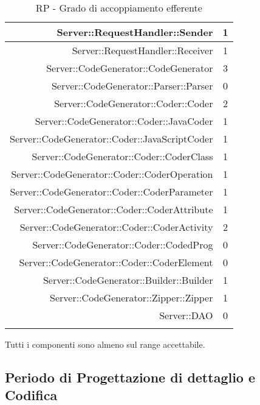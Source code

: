 \documentclass[../PianoDiQualifica.tex]{subfiles}
\begin{document}
\begin{longtable}{|r|c|}
					Server::RequestHandler::Sender & 1 \\ \hline
					Server::RequestHandler::Receiver & 1 \\ \hline
					Server::CodeGenerator::CodeGenerator & 3 \\ \hline
					Server::CodeGenerator::Parser::Parser & 0 \\ \hline
					Server::CodeGenerator::Coder::Coder & 2 \\ \hline
					Server::CodeGenerator::Coder::JavaCoder & 1\\ \hline
					Server::CodeGenerator::Coder::JavaScriptCoder & 1\\ \hline
					Server::CodeGenerator::Coder::CoderClass & 1\\ \hline
					Server::CodeGenerator::Coder::CoderOperation & 1\\ \hline
					Server::CodeGenerator::Coder::CoderParameter & 1\\ \hline
					Server::CodeGenerator::Coder::CoderAttribute & 1\\ \hline
					Server::CodeGenerator::Coder::CoderActivity & 2\\ \hline
					Server::CodeGenerator::Coder::CodedProg & 0\\ \hline
					Server::CodeGenerator::Coder::CoderElement & 0\\ \hline
					Server::CodeGenerator::Builder::Builder & 1 \\ \hline
					Server::CodeGenerator::Zipper::Zipper & 1 \\ \hline
					Server::DAO & 0 \\ \hline
				\caption{RP - Grado di accoppiamento efferente}
				\end{longtable}
				Tutti i componenti sono almeno sul range accettabile.
			\subsection{Periodo di Progettazione di dettaglio e Codifica}
\end{document}
